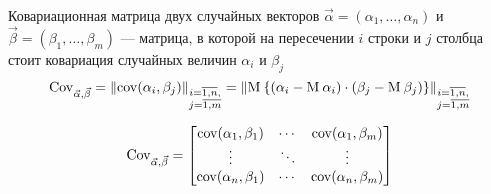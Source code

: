 \begin{definition}\label{def:covMatrix}
  Ковариационная матрица двух случайных векторов
  $\vec{\alpha} = \left( \alpha_1, \dots, \alpha_n \right)$ и
  $\vec{\beta} = \left( \beta_1, \dots, \beta_m \right)$ --- матрица,
  в которой на пересечении $i$ строки и $j$ столбца стоит ковариация случайных
  величин $\alpha_i$ и $\beta_j$
  $$\operatorname{Cov}^{}_{\vec{\alpha}, \vec{\beta}}
      = \left\| \operatorname{cov}\!\left( \alpha_i, \beta_j \right) \right\|_{
      \substack{i= \overline{1,n},\\j= \overline{1,m}}}
      = \left\| \operatorname{M}_{} 
      \left\{ \left( \alpha_i - \operatorname{M}_{} \alpha_i \right)
          \cdot \left( \beta_j - \operatorname{M}_{} \beta_j \right)
      \right\} \right\|_{
          \substack{i= \overline{1,n},\\j= \overline{1,m}}}$$

  $$\operatorname{Cov}^{}_{\vec{\alpha}, \vec{\beta}} =
  \begin{bmatrix}
      \operatorname{cov}\!\left( \alpha_1, \beta_1 \right) & \cdots & \operatorname{cov}\!\left( \alpha_1, \beta_m \right) \\
      \vdots & \ddots & \vdots \\
      \operatorname{cov}\!\left( \alpha_n, \beta_1 \right) & \cdots & \operatorname{cov}\!\left( \alpha_n, \beta_m \right)
  \end{bmatrix}$$
\end{definition}

